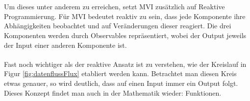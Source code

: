 \\
\\
Um dieses unter anderem zu erreichen, setzt MVI zusätzlich auf Reaktive Programmierung. Für MVI bedeutet reaktiv zu sein, dass jede Komponente ihre Abhängigkeiten beobachtet und auf Veränderungen dieser reagiert. Die drei Komponenten werden durch Observables repräsentiert, wobei der Output jeweils der Input einer anderen Komponente ist.
\\
\\
Fast noch wichtiger als der reaktive Ansatz ist zu verstehen, wie der Kreislauf in Figur \ref{fig:datenflussFlux} etabliert werden kann. Betrachtet man diesen Kreis etwas genauer, so wird deutlich, dass auf einen Input immer ein Output folgt. Dieses Konzept findet man auch in der Mathematik wieder: Funktionen.